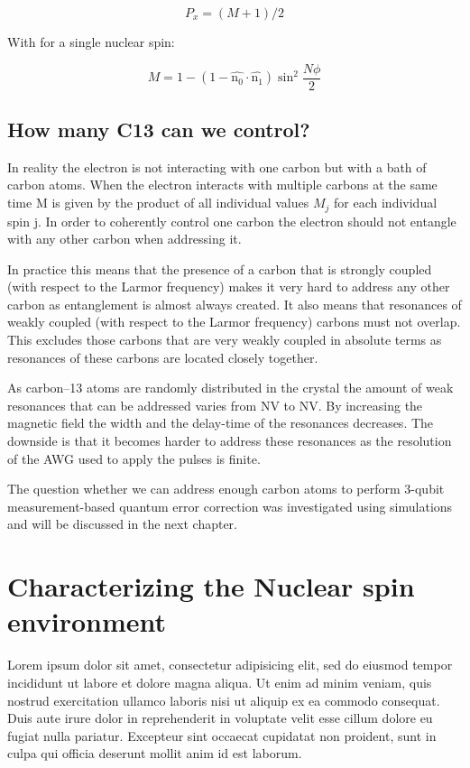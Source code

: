 \begin{equation}
P_x = (M+1)/2
\end{equation}

With for a single nuclear spin:

\begin{equation}
M = 1-(1 - \hat{\bm{\mathrm{n_0}}} \cdot \hat{\bm{\mathrm{n_1}}}) \sin^2 \frac{N\phi}{2}
\end{equation}

\subsection{How many C13 can we control?}
\label{howmanyc13canwecontrol}

In reality the electron is not interacting with one carbon but with a bath of carbon atoms. When the electron interacts with multiple carbons at the same time M is given by the product of all individual values $M_j$ for each individual spin j. In order to coherently control one carbon the electron should not entangle with any other carbon when addressing it.

In practice this means that the presence of a carbon that is strongly coupled (with respect to the Larmor frequency) makes it very hard to address any other carbon as entanglement is almost always created. It also means that resonances of weakly coupled (with respect to the Larmor frequency) carbons must not overlap. This excludes those carbons that are very weakly coupled in absolute terms as resonances of these carbons are located closely together.

As carbon--13 atoms are randomly distributed in the crystal the amount of weak resonances that can be addressed varies from NV to NV. By increasing the magnetic field the width and the delay-time of the resonances decreases. The downside is that it becomes harder to address these resonances as the resolution of the AWG used to apply the pulses is finite.

The question whether we can address enough carbon atoms to perform 3-qubit measurement-based quantum error correction was investigated using simulations and will be discussed in the next chapter.

\section{Characterizing the Nuclear spin environment}
Lorem ipsum dolor sit amet, consectetur adipisicing elit, sed do eiusmod
tempor incididunt ut labore et dolore magna aliqua. Ut enim ad minim veniam,
quis nostrud exercitation ullamco laboris nisi ut aliquip ex ea commodo
consequat. Duis aute irure dolor in reprehenderit in voluptate velit esse
cillum dolore eu fugiat nulla pariatur. Excepteur sint occaecat cupidatat non
proident, sunt in culpa qui officia deserunt mollit anim id est laborum.

